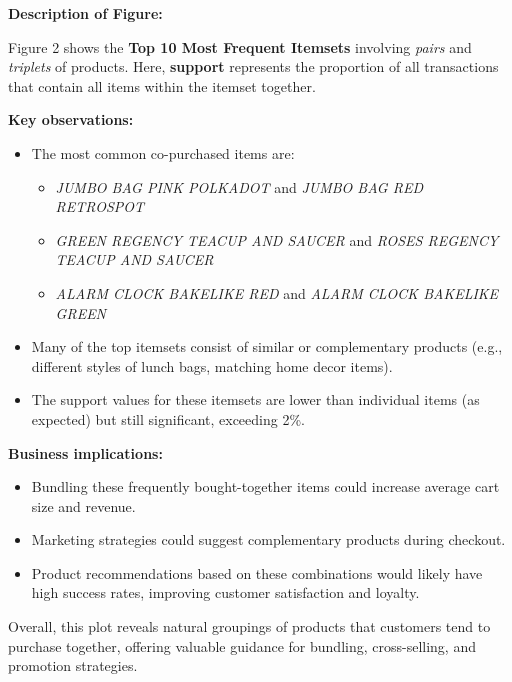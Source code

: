 \documentclass[12pt]{article}
\begin{document}
\noindent
\textbf{Description of Figure:} \\

\vspace{0.2cm}

Figure 2 shows the \textbf{Top 10 Most Frequent Itemsets} involving \textit{pairs} and \textit{triplets} of products.  
Here, \textbf{support} represents the proportion of all transactions that contain all items within the itemset together.

\vspace{0.4cm}

\textbf{Key observations:}
\begin{itemize}
    \item The most common co-purchased items are:
    \begin{itemize}
        \item \textit{JUMBO BAG PINK POLKADOT} and \textit{JUMBO BAG RED RETROSPOT}
        \item \textit{GREEN REGENCY TEACUP AND SAUCER} and \textit{ROSES REGENCY TEACUP AND SAUCER}
        \item \textit{ALARM CLOCK BAKELIKE RED} and \textit{ALARM CLOCK BAKELIKE GREEN}
    \end{itemize}
    \item Many of the top itemsets consist of similar or complementary products (e.g., different styles of lunch bags, matching home decor items).
    \item The support values for these itemsets are lower than individual items (as expected) but still significant, exceeding 2\%.
\end{itemize}

\vspace{0.4cm}

\textbf{Business implications:}
\begin{itemize}
    \item Bundling these frequently bought-together items could increase average cart size and revenue.
    \item Marketing strategies could suggest complementary products during checkout.
    \item Product recommendations based on these combinations would likely have high success rates, improving customer satisfaction and loyalty.
\end{itemize}

\vspace{0.4cm}

Overall, this plot reveals natural groupings of products that customers tend to purchase together, offering valuable guidance for bundling, cross-selling, and promotion strategies.
\end{document}
